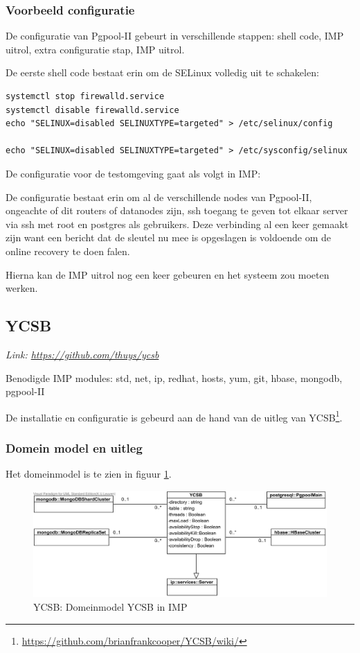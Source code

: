 \subsubsection{Voorbeeld configuratie}
De configuratie van Pgpool-II gebeurt in verschillende stappen: shell code, IMP uitrol, extra configuratie stap, IMP uitrol. 

De eerste shell code bestaat erin om de SELinux volledig uit te schakelen: 
\begin{lstlisting}[frame=single, breaklines=true]
systemctl stop firewalld.service  
systemctl disable firewalld.service  
echo "SELINUX=disabled SELINUXTYPE=targeted" > /etc/selinux/config

echo "SELINUX=disabled SELINUXTYPE=targeted" > /etc/sysconfig/selinux
\end{lstlisting}

De configuratie voor de testomgeving gaat als volgt in IMP: 



De configuratie bestaat erin om al de verschillende nodes van Pgpool-II, ongeachte of dit routers of datanodes zijn, ssh toegang te geven tot elkaar server via ssh met root en postgres als gebruikers. Deze verbinding al een keer gemaakt zijn want een bericht dat de sleutel nu mee is opgeslagen is voldoende om de online recovery te doen falen. 

Hierna kan de IMP uitrol nog een keer gebeuren en het systeem zou moeten werken. 


\subsection{YCSB}
\textit{Link: \url{https://github.com/thuys/ycsb}}

Benodigde IMP modules: std, net, ip, redhat, hosts, yum, git, hbase, mongodb, pgpool-II 

De installatie en configuratie is gebeurd aan de hand van de uitleg van YCSB\footnote{\url {https://github.com/brianfrankcooper/YCSB/wiki/}}. 

\subsubsection{Domein model en uitleg}
Het domeinmodel is te zien in figuur \ref{fig:imp-ycsb-domeinmodel}.
\begin{figure}[ht!]
\centering
\includegraphics[width=\linewidth]{img/YCSB-Domeinmodel.png}
\caption{YCSB: Domeinmodel YCSB in IMP}
\label{fig:imp-ycsb-domeinmodel}
\end{figure}

